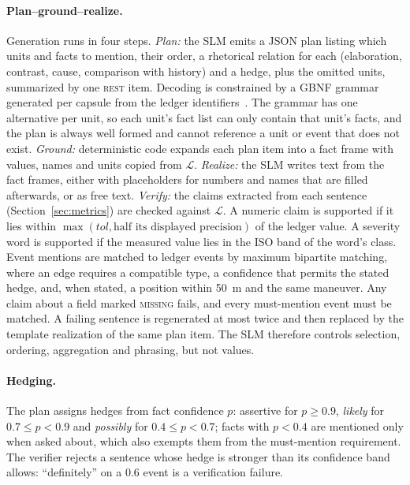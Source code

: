 \paragraph{Plan--ground--realize.}
Generation runs in four steps.
\emph{Plan:} the SLM emits a JSON plan listing which units and facts to mention, their order, a rhetorical relation for each (elaboration, contrast, cause, comparison with history) and a hedge, plus the omitted units, summarized by one \textsc{rest} item.
Decoding is constrained by a GBNF grammar generated per capsule from the ledger identifiers~\cite{ggerganov_llamacpp,geng2023grammar}.
The grammar has one alternative per unit, so each unit's fact list can only contain that unit's facts, and the plan is always well formed and cannot reference a unit or event that does not exist.
\emph{Ground:} deterministic code expands each plan item into a fact frame with values, names and units copied from $\mathcal L$.
\emph{Realize:} the SLM writes text from the fact frames, either with placeholders for numbers and names that are filled afterwards, or as free text.
\emph{Verify:} the claims extracted from each sentence (Section~\ref{sec:metrics}) are checked against $\mathcal L$.
A numeric claim is supported if it lies within $\max(\mathit{tol},\text{half its displayed precision})$ of the ledger value.
A severity word is supported if the measured value lies in the ISO band of the word's class.
Event mentions are matched to ledger events by maximum bipartite matching, where an edge requires a compatible type, a confidence that permits the stated hedge, and, when stated, a position within 50~m and the same maneuver.
Any claim about a field marked \textsc{missing} fails, and every must-mention event must be matched.
A failing sentence is regenerated at most twice and then replaced by the template realization of the same plan item.
The SLM therefore controls selection, ordering, aggregation and phrasing, but not values.

\paragraph{Hedging.}
The plan assigns hedges from fact confidence $p$: assertive for $p\ge0.9$, \emph{likely} for $0.7\le p<0.9$ and \emph{possibly} for $0.4\le p<0.7$; facts with $p<0.4$ are mentioned only when asked about, which also exempts them from the must-mention requirement.
The verifier rejects a sentence whose hedge is stronger than its confidence band allows: ``definitely'' on a 0.6 event is a verification failure.

